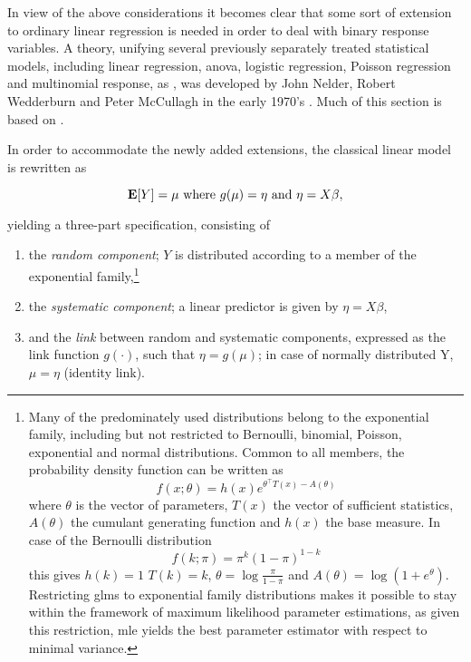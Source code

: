 In view of the above considerations it becomes clear that some sort of extension to ordinary linear regression is needed in order to deal with binary response variables. A theory, unifying several previously separately treated statistical models, including linear regression, \gls{anova}, logistic regression, Poisson regression and multinomial response, as , was developed by John Nelder, Robert Wedderburn and Peter McCullagh in the early 1970's \citep{Nelder1972,McCullagh1989}. Much of this section is based on \citep{McCullagh1989}.

In order to accommodate the newly added extensions, the classical linear model is rewritten as

\begin{equation}
  \operatorname{\mathbf{E}}[Y] = \mu \text{ where } g(\mu) = \eta \text{ and } \eta = X \beta,
\end{equation}

yielding a three-part specification, consisting of

\begin{enumerate}[label=(\alph*)]
  \item the \textit{random component}; $Y$ is distributed according to a member of the exponential family,\footnote{Many of the predominately used distributions belong to the exponential family, including but not restricted to Bernoulli, binomial, Poisson, exponential and normal distributions. Common to all members, the probability density function can be written as
  \begin{equation}
    f(x;\theta) = h(x) e^{\theta^\intercal T(x)-A(\theta)}
  \end{equation}
  where $\theta$ is the vector of parameters, $T(x)$ the vector of sufficient statistics, $A(\theta)$ the cumulant generating function and $h(x)$ the base measure. In case of the Bernoulli distribution
  \begin{equation}
    f(k;\pi) = \pi^k (1-\pi)^{1-k}\label{eq:bern-pmf}
  \end{equation}
  this gives $h(k) = 1$ $T(k) = k$, $\theta = \log\frac{\pi}{1-\pi}$ and $A(\theta) = \log(1+e^\theta)$. Restricting \glspl{glm} to exponential family distributions makes it possible to stay within the framework of maximum likelihood parameter estimations, as given this restriction, \gls{mle} yields the best parameter estimator with respect to minimal variance.}
  \item the \textit{systematic component}; a linear predictor is given by $\eta = X\beta$,
  \item and the \textit{link} between random and systematic components, expressed as the link function $g(\cdot)$, such that $\eta = g(\mu)$; in case of normally distributed Y, $\mu = \eta$ (identity link).
\end{enumerate}

